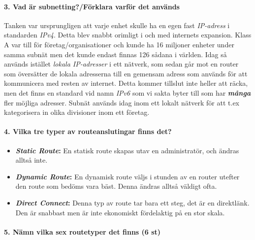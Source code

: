\paragraph{3. Vad är subnetting?/Förklara varför det används}
Tanken var ursprungligen att varje enhet skulle ha en egen fast \textit{IP-adress} i standarden \textit{IPv4}. Detta blev snabbt orimligt i och med internets expansion. Klass A var till för företag/organisationer och kunde ha 16 miljoner enheter under samma subnät men det kunde endast finnas 126 sådana i världen. Idag så används istället \textit{lokala IP-adresser} i ett nätverk, som sedan går mot en router som översätter de lokala adresserna till en gemensam adress som används för att kommunicera med resten av internet. Detta kommer tillslut inte heller att räcka, men det finns en standard vid namn \textit{IPv6} som vi sakta byter till som har \textbf{\textit{många}} fler möjliga adresser. Subnät används idag inom ett lokalt nätverk för att t.ex kategorisera in olika divisioner inom ett företag.

\paragraph{4. Vilka tre typer av routeanslutingar finns det?}

\begin{itemize}
	\item \textbf{\textit{Static Route}:} En statisk route skapas utav en administratör, och ändras alltså inte.
	\item \textbf{\textit{Dynamic Route}:} En dynamisk route väljs i stunden av en router utefter den route som bedöms vara  bäst. Denna ändras alltså väldigt ofta.
	\item \textbf{\textit{Direct Connect}:} Denna typ av route tar bara ett steg, det är en direktlänk. Den är snabbast men är inte ekonomiskt fördelaktig på en stor skala.
\end{itemize}
 
\paragraph{5. Nämn vilka sex routetyper det finns (6 st)}

